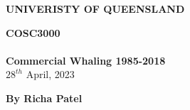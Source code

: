 \documentclass[12pt,a4paper]{article}
\renewcommand{\large}{\fontsize{14}{15}\selectfont}  %
\begin{document}
    \begin{titlepage}

        \begin{center}
                \textbf{UNIVERISTY OF QUEENSLAND }
        \end{center}
   
    \vspace*{2cm}
   \begin{center} %
        \Huge{\textbf{COSC3000\\}}
        \LARGE{\color{teal}{VISUALISATION PROJECT}}\\
        \vspace{0.4cm}
        \textbf{Commercial Whaling 1985-2018}\\
        \vspace{0.1 cm}
        \Large{$28^{th}$ April, 2023}
    \end{center}

    
    \vspace*{5cm}

    \begin{center}
    \large
         \textbf{By Richa Patel}
    \end{center}
      
    

        
    
    

    \end{titlepage}







\end{document}
